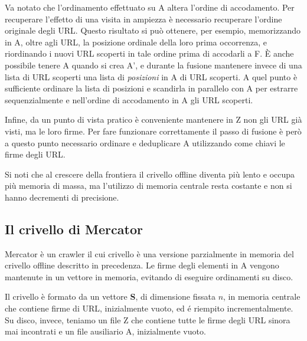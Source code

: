 Va notato che l'ordinamento effettuato su A altera l'ordine di accodamento. Per recuperare l'effetto di una visita in ampiezza è necessario recuperare l'ordine originale degli URL. Questo risultato si può ottenere, per esempio, memorizzando in A, oltre agli URL, la posizione ordinale della loro prima occorrenza, e riordinando i nuovi URL scoperti in tale ordine prima di accodarli a F. È anche possibile tenere A quando si crea A', e durante la fusione mantenere invece di una lista di URL scoperti una lista di \textit{posizioni} in A di URL scoperti. A quel punto è sufficiente ordinare la lista di posizioni e scandirla in parallelo con A per estrarre sequenzialmente e nell'ordine di accodamento in A gli URL scoperti.

Infine, da un punto di vista pratico è conveniente mantenere in Z non gli URL già visti, ma le loro firme. Per fare funzionare correttamente il passo di fusione è però a questo punto necessario ordinare e deduplicare A utilizzando come chiavi le firme degli URL.

Si noti che al crescere della frontiera il crivello offline diventa più lento e occupa più memoria di massa, ma l'utilizzo di memoria centrale resta costante e non si hanno decrementi di precisione.
\subsection{Il crivello di Mercator}
Mercator è un crawler \cite{Mercator} il cui crivello è una versione parzialmente in memoria del crivello offline descritto in precedenza. Le firme degli elementi in A vengono mantenute in un vettore in memoria, evitando di eseguire ordinamenti su disco.

Il crivello è formato da un vettore \textbf{S}, di dimensione fissata $n$, in memoria centrale che contiene firme di URL, inizialmente vuoto, ed é riempito incrementalmente. Su disco, invece, teniamo un file Z che contiene tutte le firme degli URL sinora mai incontrati e un file ausiliario A, inizialmente vuoto.

